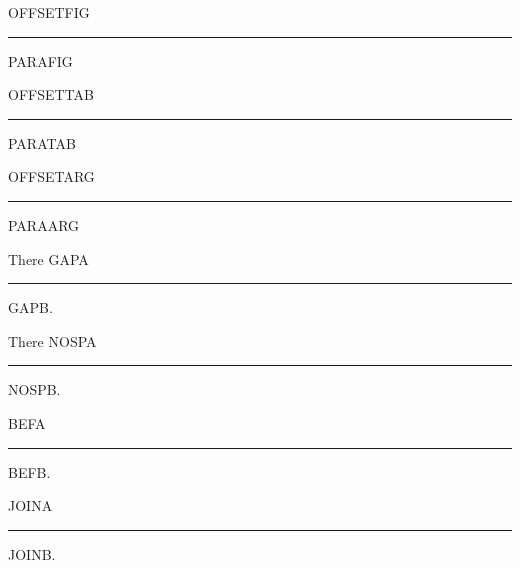 \documentclass[a4paper]{memoir}
\begin{document}
\raggedright
\begin{marginfigure}OFFSETFIG\\\rule{2cm}{2mm}\end{marginfigure}
PARAFIG \lipsum[1][1-5]

\begin{margintable}OFFSETTAB\\\rule{2cm}{2mm}\end{margintable}
PARATAB \lipsum[2][1-5]

\begin{marginfigure}[-1.2ex]OFFSETARG\\\rule{2cm}{2mm}\end{marginfigure}
PARAARG \lipsum[3][1-5]

There\label{case:nostale} GAPA \begin{marginfigure}\rule{2cm}{2mm}\end{marginfigure} GAPB. \lipsum[4][1-5]

There \label{case:stale}NOSPA\begin{marginfigure}\rule{2cm}{2mm}\end{marginfigure} NOSPB. \lipsum[5][1-5]

BEFA \begin{marginfigure}\rule{2cm}{2mm}\end{marginfigure}BEFB. \lipsum[6][1-5]

JOINA\begin{marginfigure}\rule{2cm}{2mm}\end{marginfigure}JOINB.
\end{document}
